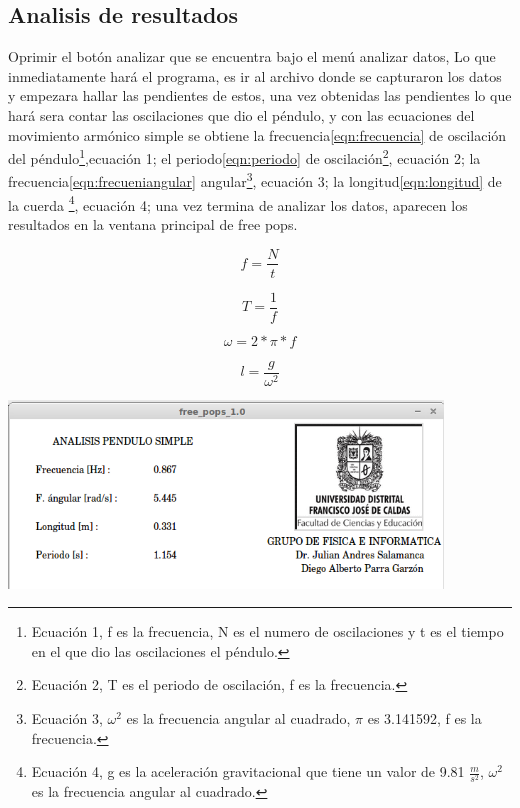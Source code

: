 \documentclass[12pt]{article}
\newenvironment{Figure}
{\par\medskip\noindent\minipage{\linewidth}}
{\endminipage\par\medskip}
\begin{document}
\begin{multicols}{2}
\section{Analisis de resultados}
Oprimir el botón analizar que se encuentra bajo el menú analizar datos, Lo que inmediatamente hará el programa, es ir al archivo donde se capturaron los datos y empezara hallar las pendientes de estos, una vez obtenidas las pendientes lo que hará sera contar las oscilaciones que dio el péndulo,  y con las ecuaciones\cite{GIANCOLI} del movimiento armónico simple se obtiene  la frecuencia\ref{eqn:frecuencia}  de oscilación del péndulo\footnote{ Ecuación 1, f es la frecuencia, N es el numero de oscilaciones y t es el tiempo en el que dio las oscilaciones el péndulo.},ecuación 1; el periodo\ref{eqn:periodo} de oscilación\footnote{Ecuación 2, T es el periodo de oscilación, f es la frecuencia.}, ecuación 2; la frecuencia\ref{eqn:frecueniangular} angular\footnote{ Ecuación 3, $\omega^2$ es la frecuencia angular al cuadrado, $\pi $ es 3.141592, f es la frecuencia.}, ecuación 3; la longitud\ref{eqn:longitud} de la cuerda \footnote{ Ecuación 4, g es la aceleración gravitacional que tiene un valor de 9.81 $\frac{m}{s^2}$, $\omega^2$ es la frecuencia angular al cuadrado.}, ecuación 4; una vez termina de analizar los datos, aparecen los resultados en la ventana principal de free pops.


\begin{equation}
\label{eqn:frecuencia}
f = \frac{N}{t}
\end{equation}

\begin{equation}
\label{eqn:periodo}
T = \frac{1}{f}
\end{equation}

\begin{equation}
\label{eqn:frecueniangular}
\omega = 2 * \pi * f
\end{equation}

\begin{equation}
\label{eqn:longitud}
 l = \frac{g}{\omega^2}  
\end{equation}

\begin{Figure}
\center
\includegraphics[width=9.cm, height=5cm]{fig/analis1.png}
\label{fig:g14}
\end{Figure}
\vspace{0.2cm}


\end{multicols}
\end{document}
